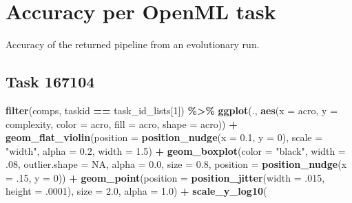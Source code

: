 \documentclass[
]{book}
\newenvironment{Shaded}{\begin{snugshade}}{\end{snugshade}}
\newcommand{\AttributeTok}[1]{\textcolor[rgb]{0.13,0.29,0.53}{#1}}
\newcommand{\ConstantTok}[1]{\textcolor[rgb]{0.56,0.35,0.01}{#1}}
\newcommand{\DecValTok}[1]{\textcolor[rgb]{0.00,0.00,0.81}{#1}}
\newcommand{\FloatTok}[1]{\textcolor[rgb]{0.00,0.00,0.81}{#1}}
\newcommand{\FunctionTok}[1]{\textcolor[rgb]{0.13,0.29,0.53}{\textbf{#1}}}
\newcommand{\NormalTok}[1]{#1}
\newcommand{\SpecialCharTok}[1]{\textcolor[rgb]{0.81,0.36,0.00}{\textbf{#1}}}
\newcommand{\StringTok}[1]{\textcolor[rgb]{0.31,0.60,0.02}{#1}}
\begin{document}
\hypertarget{accuracy-per-openml-task-1}{%
\section{Accuracy per OpenML task}\label{accuracy-per-openml-task-1}}

Accuracy of the returned pipeline from an evolutionary run.

\hypertarget{task-167104-1}{%
\subsection{Task 167104}\label{task-167104-1}}

\begin{Shaded}
\begin{Highlighting}[]
\FunctionTok{filter}\NormalTok{(comps, taskid }\SpecialCharTok{==}\NormalTok{ task\_id\_lists[}\DecValTok{1}\NormalTok{]) }\SpecialCharTok{\%\textgreater{}\%}
  \FunctionTok{ggplot}\NormalTok{(., }\FunctionTok{aes}\NormalTok{(}\AttributeTok{x =}\NormalTok{ acro, }\AttributeTok{y =}\NormalTok{ complexity, }\AttributeTok{color =}\NormalTok{ acro,}
                \AttributeTok{fill =}\NormalTok{ acro, }\AttributeTok{shape =}\NormalTok{ acro)) }\SpecialCharTok{+}
  \FunctionTok{geom\_flat\_violin}\NormalTok{(}\AttributeTok{position =} \FunctionTok{position\_nudge}\NormalTok{(}\AttributeTok{x =} \FloatTok{0.1}\NormalTok{, }\AttributeTok{y =} \DecValTok{0}\NormalTok{),}
                   \AttributeTok{scale =} \StringTok{"width"}\NormalTok{, }\AttributeTok{alpha =} \FloatTok{0.2}\NormalTok{, }\AttributeTok{width =} \FloatTok{1.5}\NormalTok{) }\SpecialCharTok{+}
  \FunctionTok{geom\_boxplot}\NormalTok{(}\AttributeTok{color =} \StringTok{"black"}\NormalTok{, }\AttributeTok{width =}\NormalTok{ .}\DecValTok{08}\NormalTok{, }\AttributeTok{outlier.shape =} \ConstantTok{NA}\NormalTok{, }\AttributeTok{alpha =} \FloatTok{0.0}\NormalTok{,}
               \AttributeTok{size =} \FloatTok{0.8}\NormalTok{, }\AttributeTok{position =} \FunctionTok{position\_nudge}\NormalTok{(}\AttributeTok{x =}\NormalTok{ .}\DecValTok{15}\NormalTok{, }\AttributeTok{y =} \DecValTok{0}\NormalTok{)) }\SpecialCharTok{+}
  \FunctionTok{geom\_point}\NormalTok{(}\AttributeTok{position =} \FunctionTok{position\_jitter}\NormalTok{(}\AttributeTok{width =}\NormalTok{ .}\DecValTok{015}\NormalTok{, }\AttributeTok{height =}\NormalTok{ .}\DecValTok{0001}\NormalTok{),}
             \AttributeTok{size =} \FloatTok{2.0}\NormalTok{, }\AttributeTok{alpha =} \FloatTok{1.0}\NormalTok{) }\SpecialCharTok{+}
  \FunctionTok{scale\_y\_log10}\NormalTok{(}

\end{Highlighting}
\end{Shaded}
\end{document}
